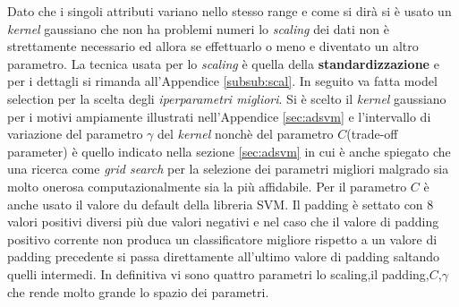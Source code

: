 Dato che i singoli attributi variano nello stesso range e come si dirà si è usato un \textit{kernel} gaussiano che non ha problemi numeri lo \textit{scaling} dei dati non è strettamente necessario ed allora se effettuarlo o meno e diventato un altro parametro. La tecnica usata per lo \textit{scaling} è quella della \textbf{standardizzazione} e per i dettagli si rimanda all'Appendice \ref{subsub:scal}. In seguito va fatta model selection per la scelta degli \textit{iperparametri migliori}. Si è scelto il \textit{kernel} gaussiano per i motivi ampiamente illustrati nell'Appendice \ref{sec:adsvm} e l'intervallo di variazione del parametro $\gamma$ del \textit{kernel} nonchè del parametro $C$(trade-off parameter) è quello indicato nella sezione \ref{sec:adsvm} in cui è anche spiegato che una ricerca come \textit{grid search} per la selezione dei parametri migliori malgrado sia molto onerosa computazionalmente sia la più affidabile.  Per il parametro $C$ è anche usato il valore du default della libreria \ac{SVM}. Il padding è settato con 8 valori positivi diversi più due valori negativi e nel caso che il valore di padding positivo corrente non produca un classificatore migliore rispetto a un valore di padding precedente si passa direttamente all'ultimo valore di padding saltando quelli intermedi. In definitiva vi sono quattro parametri lo scaling,il padding,$C$,$\gamma$ che rende molto grande lo spazio dei parametri.\\



